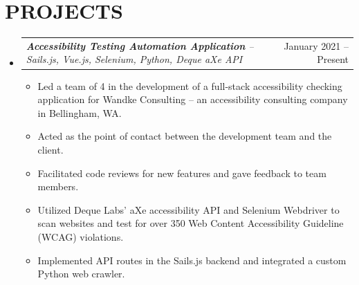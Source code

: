 \documentclass[letterpaper,11pt]{article}
\makeatletter
\newcommand{\resumeItem}[1]{
  \item\small{
    {#1 \vspace{-1pt}}
  }
}
\newcommand{\resumeProjectHeading}[2]{
    \item
    \begin{tabular*}{\textwidth}{l@{\extracolsep{\fill}}r}
        \textit{\small#1} & {\color{dark-grey}\small #2}\vspace{2pt} \\
    \end{tabular*}\vspace{-5pt}
}
\newcommand{\resumeSubHeadingListStart}{\begin{itemize}[leftmargin=0in, label={}]}
\newcommand{\resumeSubHeadingListEnd}{\end{itemize}}
\newcommand{\resumeItemListStart}{\begin{itemize}}
\newcommand{\resumeItemListEnd}{\end{itemize}\vspace{0pt}}
\makeatother
\begin{document}
\section{PROJECTS}
    \resumeSubHeadingListStart
      \resumeProjectHeading
      {\textbf{Accessibility Testing Automation Application} -- Sails.js, Vue.js, Selenium, Python, Deque aXe API}{January 2021 -- Present}
          \resumeItemListStart
            \resumeItem{Led a team of 4 in the development of a full-stack accessibility checking application for Wandke Consulting -- an accessibility consulting company in Bellingham, WA.}
            \resumeItem{Acted as the point of contact between the development team and the client.}
            \resumeItem{Facilitated code reviews for new features and gave feedback to team members.}
            \resumeItem{Utilized Deque Labs’ aXe accessibility API and Selenium Webdriver to scan websites and test for over 350 Web Content Accessibility Guideline (WCAG) violations.}
            \resumeItem{Implemented API routes in the Sails.js backend and integrated a custom Python web crawler.}
          \resumeItemListEnd

    \resumeSubHeadingListEnd
\end{document}
